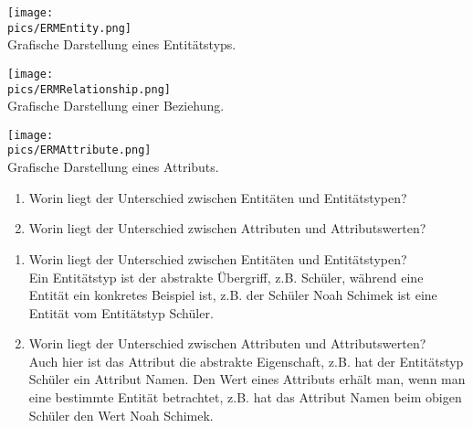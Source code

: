 \begin{minipage}{\textwidth}
	\begin{minipage}{0.33\textwidth}
		\centering\texttt{[image: \\pics/ERMEntity.png]}\\
		Grafische Darstellung eines Entitätstyps.
	\end{minipage}
	\begin{minipage}{0.33\textwidth}
		\centering\texttt{[image: \\pics/ERMRelationship.png]}\\
		Grafische Darstellung einer Beziehung.
	\end{minipage}
	\begin{minipage}{0.33\textwidth}
		\centering\texttt{[image: \\pics/ERMAttribute.png]}\\
		Grafische Darstellung eines Attributs.
	\end{minipage}
\end{minipage}
\begin{Exercise}[title={Beantworte folgende Fragen.}, label=ERMFragen1]
	\begin{enumerate}
		\item Worin liegt der Unterschied zwischen Entitäten und Entitätstypen?
		\item Worin liegt der Unterschied zwischen Attributen und Attributswerten?
	\end{enumerate}
\end{Exercise}
\begin{Answer}[ref=ERMFragen1]
	\begin{enumerate}
		\item Worin liegt der Unterschied zwischen Entitäten und Entitätstypen?\\
		Ein Entitätstyp ist der abstrakte Übergriff, z.B. Schüler, während eine Entität ein konkretes Beispiel ist, z.B. der Schüler Noah Schimek ist eine Entität vom Entitätstyp Schüler.
		\item Worin liegt der Unterschied zwischen Attributen und Attributswerten?\\
		Auch hier ist das Attribut die abstrakte Eigenschaft, z.B. hat der Entitätstyp Schüler ein Attribut Namen. Den Wert eines Attributs erhält man, wenn man eine bestimmte Entität betrachtet, z.B. hat das Attribut Namen beim obigen Schüler den Wert Noah Schimek.
	\end{enumerate}
\end{Answer}
